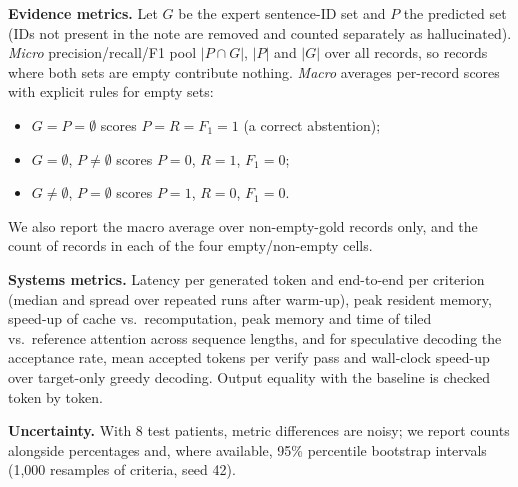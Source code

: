\textbf{Evidence metrics.} Let $G$ be the expert sentence-ID set and $P$ the predicted set (IDs not present in the note are removed and counted separately as hallucinated). \emph{Micro} precision/recall/F1 pool $|P\cap G|$, $|P|$ and $|G|$ over all records, so records where both sets are empty contribute nothing. \emph{Macro} averages per-record scores with explicit rules for empty sets:
\begin{itemize}
\item $G=P=\emptyset$ scores $P=R=F_1=1$ (a correct abstention);
\item $G=\emptyset$, $P\neq\emptyset$ scores $P=0$, $R=1$, $F_1=0$;
\item $G\neq\emptyset$, $P=\emptyset$ scores $P=1$, $R=0$, $F_1=0$.
\end{itemize}
We also report the macro average over non-empty-gold records only, and the count of records in each of the four empty/non-empty cells.

\textbf{Systems metrics.} Latency per generated token and end-to-end per criterion (median and spread over repeated runs after warm-up), peak resident memory, speed-up of cache vs.\ recomputation, peak memory and time of tiled vs.\ reference attention across sequence lengths, and for speculative decoding the acceptance rate, mean accepted tokens per verify pass and wall-clock speed-up over target-only greedy decoding. Output equality with the baseline is checked token by token.

\textbf{Uncertainty.} With 8 test patients, metric differences are noisy; we report counts alongside percentages and, where available, 95\% percentile bootstrap intervals (1{,}000 resamples of criteria, seed 42).
